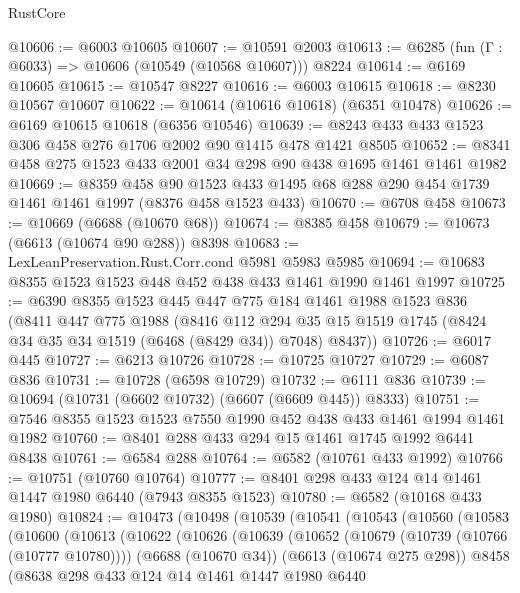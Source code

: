 \begin{lexlean}{RustCore}
\begin{coremodule}
{\begin{coremodule}
{{{{{{{{{{{{{{{{{{{{{{{{{{{{{{{{{{{{{{{{{{{{{{{@10606 := @6003 @10605
@10607 := @10591 @2003
@10613 := @6285 (fun (Γ : @6033) => @10606 (@10549 (@10568 @10607))) @8224
@10614 := @6169 @10605
@10615 := @10547 @8227
@10616 := @6003 @10615
@10618 := @8230 @10567 @10607
@10622 := @10614 (@10616 @10618) (@6351 @10478)
@10626 := @6169 @10615 @10618 (@6356 @10546)
@10639 := @8243 @433 @433 @1523 @306 @458 @276 @1706 @2002 @90 @1415 @478 @1421 @8505
@10652 := @8341 @458 @275 @1523 @433 @2001 @34 @298 @90 @438 @1695 @1461 @1461 @1982
@10669 := @8359
    @458
    @90
    @1523
    @433
    @1495
    @68
    @288
    @290
    @454
    @1739
    @1461
    @1461
    @1997
    (@8376 @458 @1523 @433)
@10670 := @6708 @458
@10673 := @10669 (@6688 (@10670 @68))
@10674 := @8385 @458
@10679 := @10673 (@6613 (@10674 @90 @288)) @8398
@10683 := LexLeanPreservation.Rust.Corr.cond @5981 @5983 @5985
@10694 := @10683 @8355 @1523 @1523 @448 @452 @438 @433 @1461 @1990 @1461 @1997
@10725 := @6390
    @8355
    @1523
    @445
    @447
    @775
    @184
    @1461
    @1988
    @1523
    @836
    (@8411
      @447
      @775
      @1988
      (@8416
        @112
        @294
        @35
        @15
        @1519
        @1745
        (@8424 @34 @35 @34 @1519 (@6468 (@8429 @34)) @7048)
        @8437))
@10726 := @6017 @445
@10727 := @6213 @10726
@10728 := @10725 @10727
@10729 := @6087 @836
@10731 := @10728 (@6598 @10729)
@10732 := @6111 @836
@10739 := @10694 (@10731 (@6602 @10732) (@6607 (@6609 @445)) @8333)
@10751 := @7546 @8355 @1523 @1523 @7550 @1990 @452 @438 @433 @1461 @1994 @1461 @1982
@10760 := @8401 @288 @433 @294 @15 @1461 @1745 @1992 @6441 @8438
@10761 := @6584 @288
@10764 := @6582 (@10761 @433 @1992)
@10766 := @10751 (@10760 @10764)
@10777 := @8401 @298 @433 @124 @14 @1461 @1447 @1980 @6440 (@7943 @8355 @1523)
@10780 := @6582 (@10168 @433 @1980)
@10824 := @10473
    (@10498
      (@10539
        (@10541
          (@10543
            (@10560
              (@10583
                (@10600
                  (@10613
                    (@10622
                      (@10626
                        (@10639
                          (@10652
                            (@10679 (@10739 (@10766 (@10777 @10780))))
                            (@6688 (@10670 @34))
                            (@6613 (@10674 @275 @298))
                            @8458
                            (@8638
                              @298
                              @433
                              @124
                              @14
                              @1461
                              @1447
                              @1980
                              @6440
}}}}}}}}}}}}}}}}}}}}}}}}}}}}}}}}}}}}}}}}}}}}}}}
\end{coremodule}}
\end{coremodule}
\end{lexlean}
